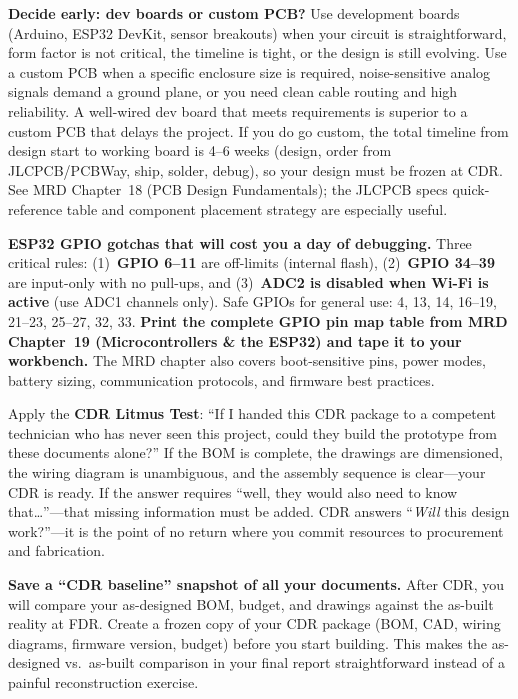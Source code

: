 \documentclass[11pt,letterpaper]{article}
\begin{document}
\begin{protip}
\textbf{Decide early: dev boards or custom PCB?} Use development boards (Arduino, ESP32 DevKit, sensor breakouts) when your circuit is straightforward, form factor is not critical, the timeline is tight, or the design is still evolving. Use a custom PCB when a specific enclosure size is required, noise-sensitive analog signals demand a ground plane, or you need clean cable routing and high reliability. A well-wired dev board that meets requirements is superior to a custom PCB that delays the project. If you do go custom, the total timeline from design start to working board is 4--6 weeks (design, order from JLCPCB/PCBWay, ship, solder, debug), so your design must be frozen at CDR. See MRD Chapter~18 (PCB Design Fundamentals); the JLCPCB specs quick-reference table and component placement strategy are especially useful.
\end{protip}

\begin{warnbox}
\textbf{ESP32 GPIO gotchas that will cost you a day of debugging.} Three critical rules: (1)~\textbf{GPIO 6--11} are off-limits (internal flash), (2)~\textbf{GPIO 34--39} are input-only with no pull-ups, and (3)~\textbf{ADC2 is disabled when Wi-Fi is active} (use ADC1 channels only). Safe GPIOs for general use: 4, 13, 14, 16--19, 21--23, 25--27, 32, 33. \textbf{Print the complete GPIO pin map table from MRD Chapter~19 (Microcontrollers \& the ESP32) and tape it to your workbench.} The MRD chapter also covers boot-sensitive pins, power modes, battery sizing, communication protocols, and firmware best practices.
\end{warnbox}

\begin{faqbox}
Apply the \textbf{CDR Litmus Test}: ``If I handed this CDR package to a competent technician who has never seen this project, could they build the prototype from these documents alone?'' If the BOM is complete, the drawings are dimensioned, the wiring diagram is unambiguous, and the assembly sequence is clear---your CDR is ready. If the answer requires ``well, they would also need to know that\ldots''---that missing information must be added. CDR answers ``\textit{Will} this design work?''---it is the point of no return where you commit resources to procurement and fabrication.
\end{faqbox}

\begin{tipbox}
\textbf{Save a ``CDR baseline'' snapshot of all your documents.} After CDR, you will compare your as-designed BOM, budget, and drawings against the as-built reality at FDR. Create a frozen copy of your CDR package (BOM, CAD, wiring diagrams, firmware version, budget) before you start building. This makes the as-designed vs.\ as-built comparison in your final report straightforward instead of a painful reconstruction exercise.
\end{tipbox}
\end{document}
